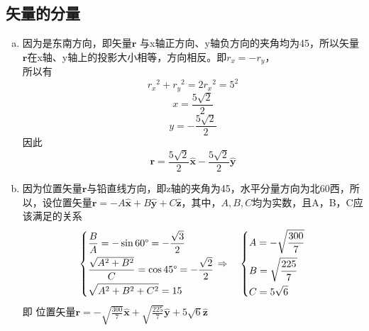\subsection{矢量的分量}
\begin{enumerate}[(a)]
	\item
	因为是东南方向，即矢量$\bm{r}$ 与x轴正方向、y轴负方向的夹角均为45\degree，所以矢量$\bm{r}$在x轴、y轴上的投影大小相等，方向相反。即$r_x = -r_y$，\\
所以有
		$$ {r_x}^2 + {r_y}^2 = 2 {r_x}^2 = 5^2 $$
		$$  x = \frac{5\sqrt{2}}{2} $$
		$$  y = -\frac{5\sqrt{2}}{2} $$
因此
		$$ \bm{r} =\frac{5\sqrt{2}}{2} \hat{\bm{x}} -\frac{5\sqrt{2}}{2} \hat{\bm{y}} $$
		
		
	\item
	因为位置矢量$\bm{r}$与铅直线方向，即z轴的夹角为45\degree，水平分量方向为北60\degree 西，所以，设位置矢量$\bm{r} = -A\hat{\bm{x}} + B\hat{\bm{y}} + C\hat{\bm{z}}$，其中，$A,  B,  C$均为实数，且A，B，C应该满足的关系
		\[
		\left\{
		\begin{aligned}
		&\frac{B}{A} = -\sin 60\degree = - \frac{\sqrt{3}}{2} \\
		&\frac{\sqrt{A^2+B^2}}{C} =\cos 45\degree=-\frac{\sqrt{2}}{2} \\
		&\sqrt{A^2+B^2+C^2} = 15
		\end{aligned}
		\right.
		 \Rightarrow \quad
		\left\{
		 \begin{aligned}
		&A = -\sqrt{\frac{300}{7}} \\
		&B = \sqrt{\frac{225}{7}} \\
		&C = 5\sqrt{6}
		 \end{aligned}
		 \right.
		\]
即 位置矢量$\bm{r} = -\sqrt{\frac{300}{7}} \hat{\bm{x}} + \sqrt{\frac{225}{7}} \hat{\bm{y}} +5\sqrt{6} \hat{\bm{z}}$
\end{enumerate}
